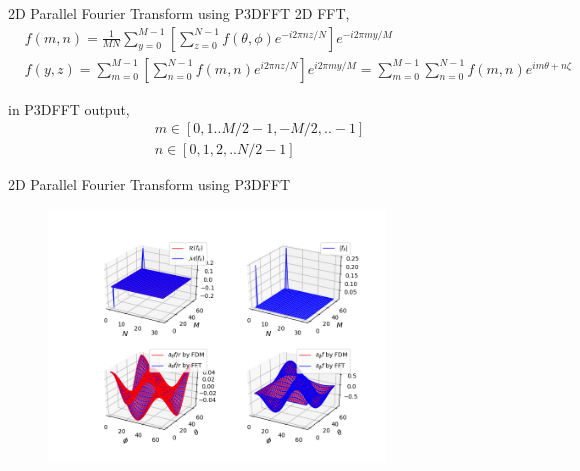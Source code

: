\documentclass{beamer}
\begin{document}
\begin{frame}{2D Parallel Fourier Transform using P3DFFT}
	2D FFT,
	\begin{equation}
		\begin{aligned}
			&f(m,n) = \frac{1}{MN}
			\sum_{y=0}^{M-1}[\sum_{z=0}^{N-1}
			f(\theta,\phi)e^{-i2\pi{n}z/N}]e^{-i2\pi{m}y/M}	\\
			&f(y,z) = \sum_{m=0}^{M-1}[\sum_{n=0}^{N-1}
			f(m,n)e^{i2\pi{n}z/N}]e^{i2\pi{m}y/M}
			=\sum_{m=0}^{M-1}\sum_{n=0}^{N-1}f(m,n)e^{i{m\theta+n\zeta}}
		\end{aligned}
	\end{equation}

	in P3DFFT output,	
	\begin{equation}
		\begin{aligned}
			m\in[0,1..M/2-1,-M/2,..-1] \\
			n\in[0,1,2,..N/2-1]
		\end{aligned}
	\end{equation}
	
\end{frame}


\begin{frame}{2D Parallel Fourier Transform using P3DFFT}
	\begin{figure}[H]
		\centering
		\includegraphics[width=0.8\textwidth]{./images/2d_kd.png}
		\caption{}
	\end{figure}
\end{frame}
\end{document}
